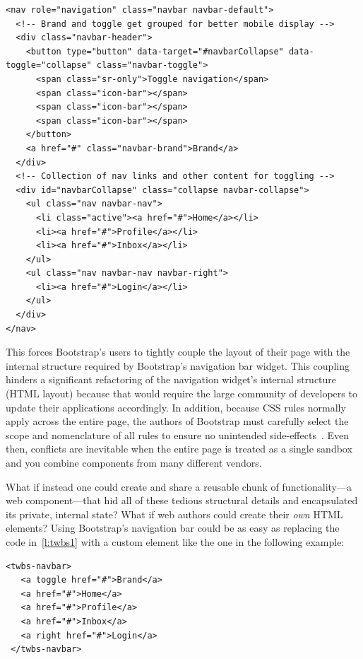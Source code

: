 \begin{lstlisting}[language=HTML5,caption={Example Twitter\index{Twitter} Bootstrap\index{Bootstrap} navigation bar HTML.},label=l:twbs1]
<nav role="navigation" class="navbar navbar-default">
  <!-- Brand and toggle get grouped for better mobile display -->
  <div class="navbar-header">
    <button type="button" data-target="#navbarCollapse" data-toggle="collapse" class="navbar-toggle">
      <span class="sr-only">Toggle navigation</span>
      <span class="icon-bar"></span>
      <span class="icon-bar"></span>
      <span class="icon-bar"></span>
    </button>
    <a href="#" class="navbar-brand">Brand</a>
  </div>
  <!-- Collection of nav links and other content for toggling -->
  <div id="navbarCollapse" class="collapse navbar-collapse">
    <ul class="nav navbar-nav">
      <li class="active"><a href="#">Home</a></li>
      <li><a href="#">Profile</a></li>
      <li><a href="#">Inbox</a></li>
    </ul>
    <ul class="nav navbar-nav navbar-right">
      <li><a href="#">Login</a></li>
    </ul>
  </div>
</nav>
\end{lstlisting}

This forces Bootstrap's users to tightly couple the layout of their page with the internal structure required by Bootstrap's navigation bar widget. 
This coupling hinders a significant refactoring of the navigation widget's internal structure (HTML layout) because that would require the large community of developers to update their applications accordingly.
In addition, because CSS rules normally apply across the entire page, the authors of Bootstrap must carefully select the scope and nomenclature of all rules to ensure no unintended side-effects~\cite{walton2014}. 
Even then, conflicts are inevitable when the entire page is treated as a single sandbox and you combine components from many different vendors. 

What if instead one could create and share a reusable chunk of functionality---a web component---that hid all of these tedious structural details and encapsulated its private, internal state? 
What if web authors could create their \textit{own} HTML elements?  
Using Bootstrap's navigation bar could be as easy as replacing the code in~\cref{l:twbs1} with a custom element like the one in the following example:

\begin{lstlisting}[language=HTML5,caption={Hypothetical custom element version of Bootstrap nav bar.},label=l:twbs2]
 <twbs-navbar>
   <a toggle href="#">Brand</a>
   <a href="#">Home</a>
   <a href="#">Profile</a>
   <a href="#">Inbox</a>
   <a right href="#">Login</a>
 </twbs-navbar>
\end{lstlisting}

